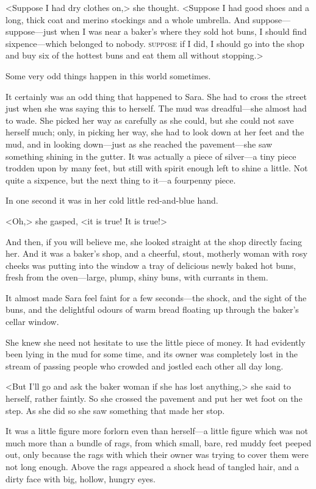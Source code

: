<Suppose I had dry clothes on,> she thought. <Suppose I had good shoes and a long, thick coat and merino stockings and a whole umbrella. And suppose—suppose—just when I was near a baker's where they sold hot buns, I should find sixpence—which belonged to nobody. \textsc{suppose} if I did, I should go into the shop and buy six of the hottest buns and eat them all without stopping.>

Some very odd things happen in this world sometimes.

It certainly was an odd thing that happened to Sara. She had to cross the street just when she was saying this to herself. The mud was dreadful—she almost had to wade. She picked her way as carefully as she could, but she could not save herself much; only, in picking her way, she had to look down at her feet and the mud, and in looking down—just as she reached the pavement—she saw something shining in the gutter. It was actually a piece of silver—a tiny piece trodden upon by many feet, but still with spirit enough left to shine a little. Not quite a sixpence, but the next thing to it—a fourpenny piece.

In one second it was in her cold little red-and-blue hand.

<Oh,> she gasped, <it is true! It is true!>

And then, if you will believe me, she looked straight at the shop directly facing her. And it was a baker's shop, and a cheerful, stout, motherly woman with rosy cheeks was putting into the window a tray of delicious newly baked hot buns, fresh from the oven—large, plump, shiny buns, with currants in them.

It almost made Sara feel faint for a few seconds—the shock, and the sight of the buns, and the delightful odours of warm bread floating up through the baker's cellar window.

She knew she need not hesitate to use the little piece of money. It had evidently been lying in the mud for some time, and its owner was completely lost in the stream of passing people who crowded and jostled each other all day long.

<But I'll go and ask the baker woman if she has lost anything,> she said to herself, rather faintly. So she crossed the pavement and put her wet foot on the step. As she did so she saw something that made her stop.

It was a little figure more forlorn even than herself—a little figure which was not much more than a bundle of rags, from which small, bare, red muddy feet peeped out, only because the rags with which their owner was trying to cover them were not long enough. Above the rags appeared a shock head of tangled hair, and a dirty face with big, hollow, hungry eyes.

